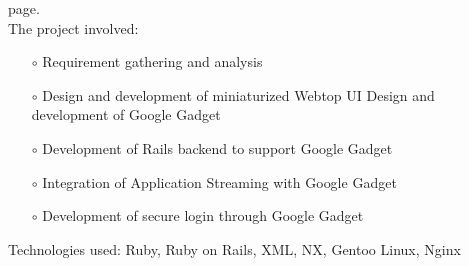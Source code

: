 \documentclass{scrartcl}
\begin{document}
\begin{cv}{
\href{http://www.develmj.com}{}
}
{\begin{itemize}
    page.\\
    The project involved:
    \begin{itemize}
    \item[\footnotesize$\circ$] Requirement gathering and analysis
    \item[\footnotesize$\circ$] Design and development of miniaturized Webtop UI
    Design and development of Google Gadget
    \item[\footnotesize$\circ$] Development of Rails backend to support Google Gadget
    \item[\footnotesize$\circ$] Integration of Application Streaming with Google Gadget
    \item[\footnotesize$\circ$] Development of secure login through
      Google Gadget
    \end{itemize}
    Technologies used: Ruby, Ruby on Rails, XML, NX, Gentoo Linux,
    Nginx
\end{itemize}
}

\vspace{0.5em}


\end{cv}
\end{document}
